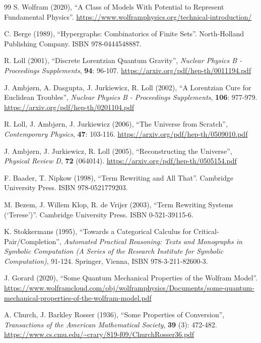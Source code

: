 \documentclass{article}
\begin{document}
\begin{thebibliography}{99}
S. Wolfram (2020), ``A Class of Models With Potential to Represent Fundamental Physics''. \url{https://www.wolframphysics.org/technical-introduction/}

C. Berge (1989), ``Hypergraphs: Combinatorics of Finite Sets''. North-Holland Publishing Company. ISBN 978-0444548887.

R. Loll (2001), ``Discrete Lorentzian Quantum Gravity'', \textit{Nuclear Physics B - Proceedings Supplements}, \textbf{94}: 96-107. \url{https://arxiv.org/pdf/hep-th/0011194.pdf}

J. Ambj{\o}rn, A. Dasgupta, J. Jurkiewicz, R. Loll (2002), ``A Lorentzian Cure for Euclidean Troubles'', \textit{Nuclear Physics B - Proceedings Supplements}, \textbf{106}: 977-979. \url{https://arxiv.org/pdf/hep-th/0201104.pdf}

R. Loll, J. Ambj{\o}rn, J. Jurkiewicz (2006), ``The Universe from Scratch'', \textit{Contemporary Physics}, \textbf{47}: 103-116. \url{https://arxiv.org/pdf/hep-th/0509010.pdf}

J. Ambj{\o}rn, J. Jurkiewicz, R. Loll (2005), ``Reconstructing the Universe'', \textit{Physical Review D}, \textbf{72} (064014). \url{https://arxiv.org/pdf/hep-th/0505154.pdf}

F. Baader, T. Nipkow (1998), ``Term Rewriting and All That''. Cambridge University Press. ISBN 978-0521779203.

M. Bezem, J. Willem Klop, R. de Vrijer (2003), ``Term Rewriting Systems (`Terese')''. Cambridge University Press. ISBN 0-521-39115-6.

K. Stokkermans (1995), ``Towards a Categorical Calculus for Critical-Pair/Completion'', \textit{Automated Practical Reasoning: Texts and Monographs in Symbolic Computation (A Series of the Research Institute for Symbolic Computation)}, 91-124. Springer, Vienna, ISBN 978-3-211-82600-3.

J. Gorard (2020), ``Some Quantum Mechanical Properties of the Wolfram Model''. \url{https://www.wolframcloud.com/obj/wolframphysics/Documents/some-quantum-mechanical-properties-of-the-wolfram-model.pdf}

A. Church, J. Barkley Rosser (1936), ``Some Properties of Conversion'', \textit{Transactions of the American Mathematical Society}, \textbf{39} (3): 472-482. \url{https://www.cs.cmu.edu/~crary/819-f09/ChurchRosser36.pdf}


\end{thebibliography}
\end{document}
